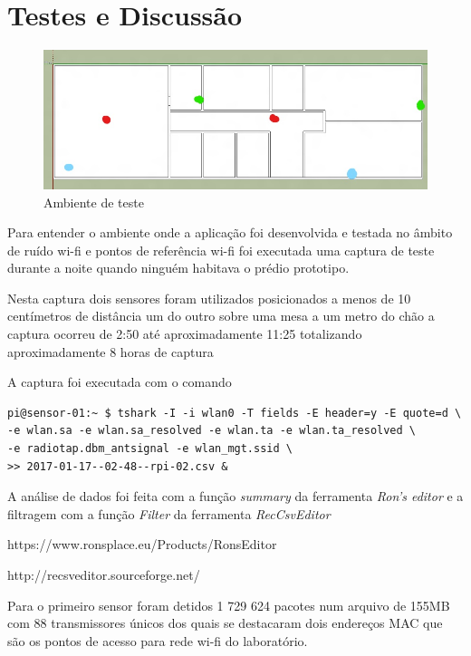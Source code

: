 \chapter{Testes e Discussão}
\label{chap:Testes}


\begin{figure}[htb]
	\caption{\label{fig-planta-baixa}Ambiente de teste}
	\begin{center}
		\includegraphics[width=1\textwidth]{060-testes/data-analisis/planta-baixa_Ink_LI.jpg}
	\end{center}
\end{figure}


Para entender  o ambiente onde a aplicação foi desenvolvida e testada no âmbito
de ruído wi-fi e pontos de referência wi-fi foi executada uma captura de teste
durante a noite quando ninguém habitava o prédio prototipo.

Nesta captura dois sensores foram utilizados posicionados a menos de 10 centímetros
de distância um do outro sobre uma mesa a um metro do chão a captura ocorreu de 2:50
até aproximadamente 11:25 totalizando aproximadamente 8 horas de captura

A captura foi executada com o comando


\begin{verbatim}
pi@sensor-01:~ $ tshark -I -i wlan0 -T fields -E header=y -E quote=d \
-e wlan.sa -e wlan.sa_resolved -e wlan.ta -e wlan.ta_resolved \
-e radiotap.dbm_antsignal -e wlan_mgt.ssid \
>> 2017-01-17--02-48--rpi-02.csv &
\end{verbatim}

A análise de dados foi feita com a função \emph{summary} da ferramenta \emph{Ron’s editor}
e a filtragem com a função \emph{Filter} da ferramenta \emph{RecCsvEditor}

https://www.ronsplace.eu/Products/RonsEditor

http://recsveditor.sourceforge.net/

Para o primeiro sensor foram detidos 1 729 624 pacotes num arquivo de 155MB
com 88 transmissores únicos dos quais se destacaram dois endereços MAC que são os
pontos de acesso para rede wi-fi do laboratório.


